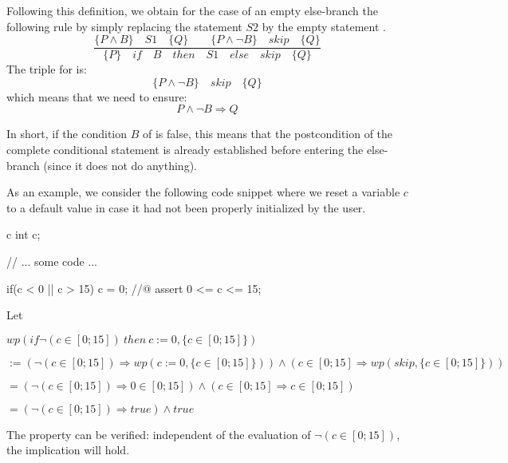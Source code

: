 

Following this definition, we obtain for the case of an empty else-branch the
following rule by simply replacing the statement $S2$ by the empty
statement .
$$\dfrac{\{P \wedge B\}\quad S1\quad \{Q\} \quad \quad \{P \wedge \neg B\}\quad skip\quad \{Q\}}{\{P\}\quad if\quad B\quad then\quad S1\quad else\quad skip \quad \{Q\}}$$
The triple for  is:
$$\{P \wedge \neg B\}\quad skip\quad \{Q\}$$
which means that we need to ensure:
$$P \wedge \neg B \Rightarrow Q$$

In short, if the condition $B$ of  is false, this means
that the postcondition of the complete conditional statement is already
established before entering the else-branch (since it does not do
anything).



As an example, we consider the following code snippet where we reset a
variable $c$ to a default value in case it had not been properly
initialized by the user.



\begin{CodeBlock}{c}
int c;

// ... some code ...

if(c < 0 || c > 15){
  c = 0;
}
//@ assert 0 <= c <= 15;
\end{CodeBlock}



Let



$wp(if \neg (c \in [0;15])\ then\ c := 0, \{c \in [0;15]\})$



$:= (\neg (c \in [0;15])\Rightarrow wp(c := 0, \{c \in [0;15]\})) \wedge (c \in [0;15]\Rightarrow wp(skip, \{c \in [0;15]\}))$



$= (\neg (c \in [0;15]) \Rightarrow 0 \in [0;15]) \wedge (c \in [0;15] \Rightarrow c \in [0;15])$



$= (\neg (c \in [0;15]) \Rightarrow true) \wedge true$



The property can be verified: independent of the evaluation of
$\neg (c \in [0;15])$, the implication will hold.



\label{l3:statements-basic-consequence}


